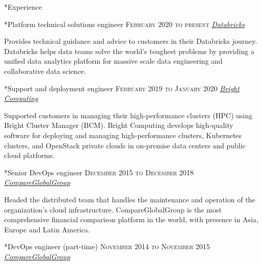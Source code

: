 \documentclass[10pt, a4paper, final]{article}
\begin{document}
\hfill
\begin{minipage}[t]{0.65\linewidth}
  \begin{section}*{Experience}
    \begin{subsection}*{Platform technical solutions engineer \hfill\textsc{February 2020 to present}}
      \href{https://databricks.com/}{\textit{Databricks}}  

      Provides technical guidance and advice to customers in their Databricks journey. Databricks helps data teams solve the world's toughest problems by providing a unified data analytics platform for massive scale data engineering and collaborative data science.
    \end{subsection}
    \vspace{1em}
  
    \begin{subsection}*{Support and deployment engineer \hfill\textsc{February 2019 to January 2020}}
      \href{https://www.brightcomputing.com/}{\textit{Bright Computing}}  

      Supported customers in managing their high-performance clusters (HPC) using Bright Cluster Manager (BCM). Bright Computing develops high-quality software for deploying and managing high-performance clusters, Kubernetes clusters, and OpenStack private clouds in on-premise data centers and public cloud platforms.
    \end{subsection}
    \vspace{1em}
  
    \begin{subsection}*{Senior DevOps engineer \hfill\textsc{December 2015 to December 2018}}
      \href{http://www.compareglobalgroup.com}{\textit{CompareGlobalGroup}}  

      Headed the distributed team that handles the maintenance and operation of the organization's cloud infrastructure. CompareGlobalGroup is the most comprehensive financial comparison platform in the world, with presence in Asia, Europe and Latin America.
    \end{subsection}
    \vspace{1em}
  
    \begin{subsection}*{DevOps engineer (part-time) \hfill\textsc{November 2014 to November 2015}}
      \href{http://www.compareglobalgroup.com}{\textit{CompareGlobalGroup}}  
    \end{subsection}
    \vspace{1em}
  

\end{section}
\end{minipage}
\end{document}
